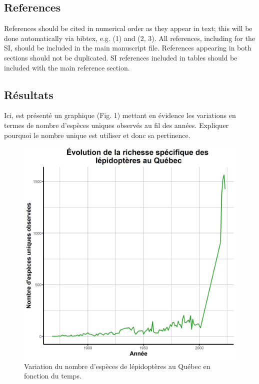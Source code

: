 \documentclass[9pt,twocolumn,twoside,]{pnas-new}
\begin{document}
\subsection*{References}\label{references}

References should be cited in numerical order as they appear in text;
this will be done automatically via bibtex, e.g. (1) and (2, 3). All
references, including for the SI, should be included in the main
manuscript file. References appearing in both sections should not be
duplicated. SI references included in tables should be included with the
main reference section.

\subsection*{Résultats}\label{Ruxe9sultats}

Ici, est présenté un graphique (Fig. 1) mettant en évidence les
variations en termes de nombre d'espèces uniques observés au fil des
années. Expliquer pourquoi le nombre unique est utiliser et donc sa
pertinence.

\begin{figure}
\includegraphics[width=0.9\linewidth]{../Figures_analyse/graphique_biodiversite} \caption{Variation du nombre d'espèces de lépidoptères au Québec en fonction du temps.}\label{fig:fig_graphique_biodiversite}
\end{figure}
\end{document}
